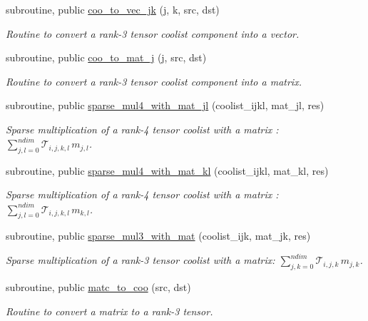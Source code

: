 \begin{DoxyCompactItemize}
subroutine, public \hyperlink{namespacetensor_abb370166c0ebd0885404c1703d464f89}{coo\+\_\+to\+\_\+vec\+\_\+jk} (j, k, src, dst)
\begin{DoxyCompactList}\small\item\em Routine to convert a rank-\/3 tensor coolist component into a vector. \end{DoxyCompactList}\item 
subroutine, public \hyperlink{namespacetensor_a2088d80a587fd931ca64976a87403401}{coo\+\_\+to\+\_\+mat\+\_\+j} (j, src, dst)
\begin{DoxyCompactList}\small\item\em Routine to convert a rank-\/3 tensor coolist component into a matrix. \end{DoxyCompactList}\item 
subroutine, public \hyperlink{namespacetensor_aae291b0fab419ce7692da1933105e9ae}{sparse\+\_\+mul4\+\_\+with\+\_\+mat\+\_\+jl} (coolist\+\_\+ijkl, mat\+\_\+jl, res)
\begin{DoxyCompactList}\small\item\em Sparse multiplication of a rank-\/4 tensor coolist with a matrix \+: ${\displaystyle \sum_{j,l=0}^{ndim}} \mathcal{T}_{i,j,k,l} \, m_{j,l} $. \end{DoxyCompactList}\item 
subroutine, public \hyperlink{namespacetensor_af65ad5ae657ecd97f70109b2c273696b}{sparse\+\_\+mul4\+\_\+with\+\_\+mat\+\_\+kl} (coolist\+\_\+ijkl, mat\+\_\+kl, res)
\begin{DoxyCompactList}\small\item\em Sparse multiplication of a rank-\/4 tensor coolist with a matrix \+: ${\displaystyle \sum_{j,l=0}^{ndim}} \mathcal{T}_{i,j,k,l} \, m_{k,l} $. \end{DoxyCompactList}\item 
subroutine, public \hyperlink{namespacetensor_a33bc74f9042478d58240b1a1a91db91d}{sparse\+\_\+mul3\+\_\+with\+\_\+mat} (coolist\+\_\+ijk, mat\+\_\+jk, res)
\begin{DoxyCompactList}\small\item\em Sparse multiplication of a rank-\/3 tensor coolist with a matrix\+: ${\displaystyle \sum_{j,k=0}^{ndim}} \mathcal{T}_{i,j,k} \, m_{j,k}$. \end{DoxyCompactList}\item 
subroutine, public \hyperlink{namespacetensor_ad868662d382dc1579db6847f2411c382}{matc\+\_\+to\+\_\+coo} (src, dst)
\begin{DoxyCompactList}\small\item\em Routine to convert a matrix to a rank-\/3 tensor. \end{DoxyCompactList}\item 

\end{DoxyCompactItemize}
